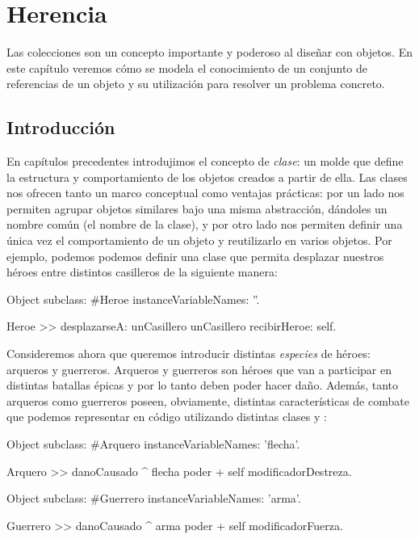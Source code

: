 \documentclass[a4paper,12pt]{book}
\begin{document}
\chapter{Herencia}
Las colecciones son un concepto importante y poderoso al diseñar con objetos. En este capítulo veremos cómo
se modela el conocimiento de un conjunto de referencias de un objeto y su utilización para resolver un problema
concreto.

\tableofcontents

\section{Introducción}

En capítulos precedentes introdujimos el concepto de \emph{clase}: un molde que define la estructura y comportamiento de los objetos creados a partir de ella. Las clases nos ofrecen tanto un marco conceptual como ventajas prácticas: por un lado nos permiten agrupar objetos similares bajo una misma abstracción, dándoles un nombre común (el nombre de la clase), y por otro lado nos permiten definir una única vez el comportamiento de un objeto y reutilizarlo en varios objetos. Por ejemplo, podemos podemos definir una clase  que permita desplazar nuestros héroes entre distintos casilleros de la siguiente manera:

\begin{code}
Object subclass: #Heroe
	instanceVariableNames: ''.
	
Heroe >> desplazarseA: unCasillero
    unCasillero recibirHeroe: self.
\end{code}

Consideremos ahora que queremos introducir distintas \emph{especies} de héroes: arqueros y guerreros. Arqueros y guerreros son héroes que van a participar en distintas batallas épicas y por lo tanto deben poder hacer daño. Además, tanto arqueros como guerreros poseen, obviamente, distintas características de combate que podemos representar en código utilizando distintas clases  y :

\begin{code}
Object subclass: #Arquero
	instanceVariableNames: 'flecha'.
	
Arquero >> danoCausado
    ^ flecha poder + self modificadorDestreza.
    
Object subclass: #Guerrero
	instanceVariableNames: 'arma'.
	
Guerrero >> danoCausado
    ^ arma poder + self modificadorFuerza.
\end{code}
\end{document}
